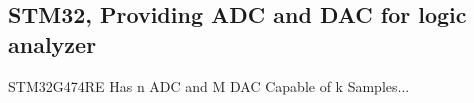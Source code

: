 \subsection{STM32, Providing ADC and DAC for logic analyzer}
	STM32G474RE Has n ADC and M DAC Capable of k Samples...